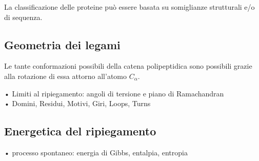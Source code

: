 {La classificazione delle proteine può essere basata su somiglianze strutturali e/o di sequenza. 

\subsection{Geometria dei legami}
{

Le tante conformazioni possibili della catena polipeptidica sono possibili grazie alla rotazione di essa attorno all'atomo $C_{\alpha}$.


• Limiti al ripiegamento: angoli di tersione e piano di Ramachandran\\

• Domini, Residui, Motivi, Giri, Loops, Turns\\
}

\subsection{Energetica del ripiegamento}
• processo spontaneo: energia di Gibbs, entalpia, entropia\\



}
